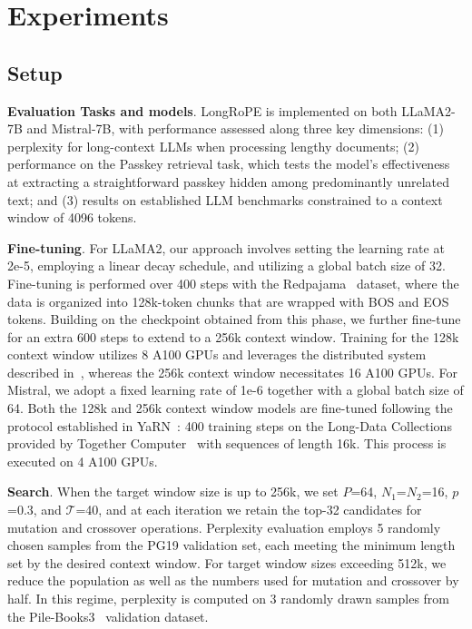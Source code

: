  \section{Experiments}

\subsection{Setup}
\textbf{Evaluation Tasks and models}. LongRoPE is implemented on both LLaMA2-7B and Mistral-7B, with performance assessed along three key dimensions: (1) perplexity for long-context LLMs when processing lengthy documents; (2) performance on the Passkey retrieval task, which tests the model’s effectiveness at extracting a straightforward passkey hidden among predominantly unrelated text; and (3) results on established LLM benchmarks constrained to a context window of 4096 tokens.

\textbf{Fine-tuning}. For LLaMA2, our approach involves setting the learning rate at 2e-5, employing a linear decay schedule, and utilizing a global batch size of 32. Fine-tuning is performed over 400 steps with the Redpajama~\cite{redpajama} dataset, where the data is organized into 128k-token chunks that are wrapped with BOS and EOS tokens. Building on the checkpoint obtained from this phase, we further fine-tune for an extra 600 steps to extend to a 256k context window. Training for the 128k context window utilizes 8 A100 GPUs and leverages the distributed system described in~\cite{cube}, whereas the 256k context window necessitates 16 A100 GPUs. For Mistral, we adopt a fixed learning rate of 1e-6 together with a global batch size of 64. Both the 128k and 256k context window models are fine-tuned following the protocol established in YaRN~\cite{yarn}: 400 training steps on the Long-Data Collections provided by Together Computer~\cite{mistraldata} with sequences of length 16k. This process is executed on 4 A100 GPUs.

\textbf{Search}. When the target window size is up to 256k, we set $P$=64, $N_1$=$N_2$=16, $p$=0.3, and $\mathcal{T}$=40, and at each iteration we retain the top-32 candidates for mutation and crossover operations. Perplexity evaluation employs 5 randomly chosen samples from the PG19 validation set, each meeting the minimum length set by the desired context window. For target window sizes exceeding 512k, we reduce the population as well as the numbers used for mutation and crossover by half. In this regime, perplexity is computed on 3 randomly drawn samples from the Pile-Books3~\cite{pile} validation dataset.

